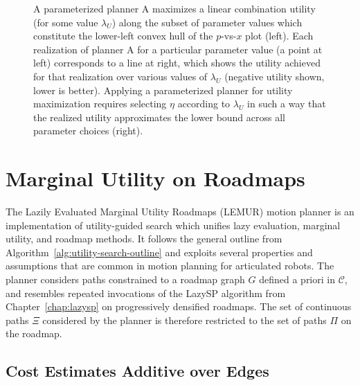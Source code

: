 \begin{figure}
   \centering
   \quad%
   \caption{A parameterized planner A maximizes a linear combination
      utility (for some value $\lambda_U$)
      along the subset of parameter values which
      constitute the lower-left convex hull of the $p$-vs-$x$ plot (left).
      Each realization of planner A for a particular parameter value
      (a point at left) corresponds to a line at right,
      which shows the utility achieved for that realization
      over various values of $\lambda_U$
      (negative utility shown, lower is better).
      Applying a parameterized planner for utility maximization
      requires selecting $\eta$ according to $\lambda_U$
      in such a way that the realized utility approximates
      the lower bound across all parameter choices (right).}
   \label{fig:convex}
\end{figure}

\section{Marginal Utility on Roadmaps}
\label{sec:roadmaps}

The Lazily Evaluated Marginal Utility Roadmaps (LEMUR) motion planner
is an implementation of utility-guided search which unifies
lazy evaluation, marginal utility, and roadmap methods.
It follows the general outline from
Algorithm~\ref{alg:utility-search-outline}
and exploits several properties and assumptions that are
common in motion planning for articulated robots.
The planner considers paths constrained to a roadmap graph $G$
defined a priori in $\mathcal{C}$,
and resembles repeated invocations of the LazySP algorithm
from Chapter~\ref{chap:lazysp}
on progressively densified roadmaps.
The set of continuous paths $\Xi$ considered by the planner is
therefore restricted to the set of paths $\Pi$ on the roadmap.


\subsection{Cost Estimates Additive over Edges}

